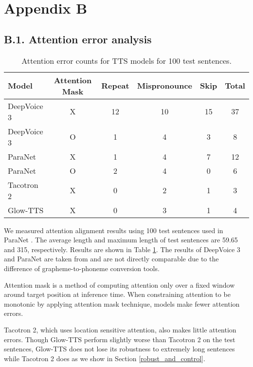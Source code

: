 \documentclass{article}
\begin{document}
\section*{Appendix B}
\subsection*{B.1. Attention error analysis}
\label{appb1}
\begin{table}[h]
    \centering
    \begin{tabular}{lc|ccc|c}
        \toprule
        \textbf{Model} & \textbf{Attention Mask} & \textbf{Repeat} & \textbf{Mispronounce} & \textbf{Skip} & \textbf{Total}\\
        \hline
        DeepVoice 3 \cite{peng2019parallel} & X & 12 & 10 & 15 & 37 \\
        \hline
        DeepVoice 3 \cite{peng2019parallel} & O & 1 & 4 & 3 & 8 \\
        \hline
        ParaNet \cite{peng2019parallel} & X & 1 & 4 & 7 & 12 \\
        \hline
        ParaNet \cite{peng2019parallel} & O & 2 & 4 & 0 & 6 \\
        \hline
        Tacotron 2 & X & 0 & 2 & 1 & 3 \\
        \hline
        Glow-TTS & X & 0 & 3 & 1 & 4 \\
        \hline
    \end{tabular}
    \caption{Attention error counts for TTS models for 100 test sentences.}
    \label{tab_attn}
\end{table}
We measured attention alignment results using 100 test sentences used in ParaNet \cite{peng2019parallel}. The average length and maximum length of test sentences are 59.65 and 315, respectively. Results are shown in Table \ref{tab_attn}. The results of DeepVoice 3 and ParaNet are taken from \cite{peng2019parallel} and are not directly comparable due to the difference of grapheme-to-phoneme conversion tools.

Attention mask \cite{peng2019parallel} is a method of computing attention only over a fixed window around target position at inference time. When constraining attention to be monotonic by applying attention mask technique, models make fewer attention errors.

Tacotron 2, which uses location sensitive attention, also makes little attention errors. Though Glow-TTS perform slightly worse than Tacotron 2 on the test sentences, Glow-TTS does not lose its robustness to extremely long sentences while Tacotron 2 does as we show in Section \ref{robust_and_control}.
\end{document}
